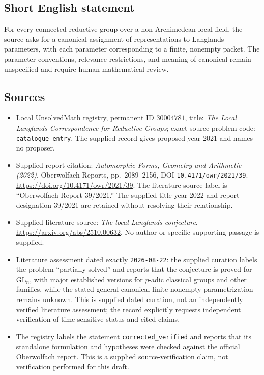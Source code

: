 \documentclass[11pt]{article}
\begin{document}
\subsection{Short English statement}
For every connected reductive group over a non-Archimedean local field, the source asks for a canonical assignment of representations to Langlands parameters, with each parameter corresponding to a finite, nonempty packet. The parameter conventions, relevance restrictions, and meaning of canonical remain unspecified and require human mathematical review.
\subsection{Sources}
\begin{itemize}
\item Local UnsolvedMath registry, permanent ID \(30004781\), title: \emph{The Local Langlands Correspondence for Reductive Groups}; exact source problem code: \texttt{catalogue entry}. The supplied record gives proposed year 2021 and names no proposer.
\item Supplied report citation: \emph{Automorphic Forms, Geometry and Arithmetic (2022)}, Oberwolfach Reports, pp.~2089--2156, DOI \texttt{10.4171/owr/2021/39}. \url{https://doi.org/10.4171/owr/2021/39}. The literature-source label is ``Oberwolfach Report 39/2021.'' The supplied title year 2022 and report designation 39/2021 are retained without resolving their relationship.
\item Supplied literature source: \emph{The local Langlands conjecture}. \url{https://arxiv.org/abs/2510.00632}. No author or specific supporting passage is supplied.
\item Literature assessment dated exactly \texttt{2026-08-22}: the supplied curation labels the problem ``partially solved'' and reports that the conjecture is proved for \(\mathrm{GL}_n\), with major established versions for \(p\)-adic classical groups and other families, while the stated general canonical finite nonempty parametrization remains unknown. This is supplied dated curation, not an independently verified literature assessment; the record explicitly requests independent verification of time-sensitive status and cited claims.
\item The registry labels the statement \texttt{corrected\_verified} and reports that its standalone formulation and hypotheses were checked against the official Oberwolfach report. This is a supplied source-verification claim, not verification performed for this draft.
\end{itemize}
\end{document}
